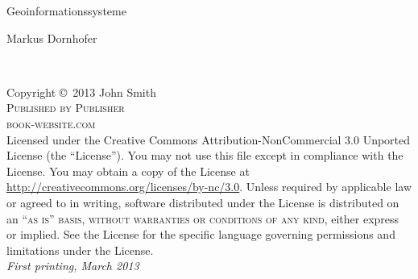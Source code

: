 \documentclass[11pt,fleqn]{book} %
\begin{document}

\begingroup
\thispagestyle{empty}
\centering
\vspace*{9cm}
\par\normalfont\fontsize{35}{35}\sffamily\selectfont
Geoinformationssysteme\par %
\vspace*{1cm}
{\Huge Markus Dornhofer}\par %
\endgroup


\newpage
~\vfill
\thispagestyle{empty}

\noindent Copyright \copyright\ 2013 John Smith\\ %

\noindent \textsc{Published by Publisher}\\ %

\noindent \textsc{book-website.com}\\ %

\noindent Licensed under the Creative Commons Attribution-NonCommercial 3.0 Unported License (the ``License''). You may not use this file except in compliance with the License. You may obtain a copy of the License at \url{http://creativecommons.org/licenses/by-nc/3.0}. Unless required by applicable law or agreed to in writing, software distributed under the License is distributed on an \textsc{``as is'' basis, without warranties or conditions of any kind}, either express or implied. See the License for the specific language governing permissions and limitations under the License.\\ %

\noindent \textit{First printing, March 2013} %


\end{document}
